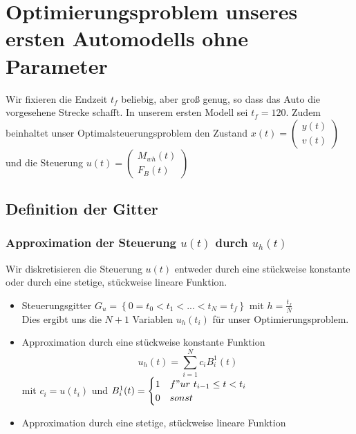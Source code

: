 \documentclass[12pt,a4paper]{article}
\theoremstyle{definition}
\theoremstyle{plain}
\begin{document}
	
	\section{Optimierungsproblem unseres ersten Automodells ohne Parameter}

	
	Wir fixieren die Endzeit $t_{f}$ beliebig, aber groß genug, so dass das Auto die vorgesehene Strecke schafft. In unserem ersten Modell sei $t_{f}=120$. Zudem beinhaltet unser Optimalsteuerungsproblem den Zustand $x(t)=\begin{pmatrix} y(t) \\ v(t) \end{pmatrix}$ und die
	Steuerung $u(t)=\begin{pmatrix} M_{wh}(t) \\ F_B(t) \end{pmatrix}$
	
	\subsection{Definition der Gitter}
	
	\subsubsection{Approximation der Steuerung $u(t)$ durch $u_{h}(t)$}
	Wir diskretisieren die Steuerung $u(t)$ entweder durch eine stückweise konstante oder durch eine stetige, stückweise lineare Funktion.
	\begin{itemize}
		\item Steuerungsgitter $G_{u}=\left\{0=t_{0} < t_{1} < ... < t_{N}=t_{f} \right\}$ mit
		$h=\frac{t_{f}}{N}$\\
		Dies ergibt uns die $N+1$ Variablen $u_{h}(t_{i})$ für unser Optimierungsproblem.
		\item Approximation durch eine stückweise konstante Funktion
		\begin{equation*}
		u_{h}(t)=\sum_{i=1}^{N}c_{i}B_{i}^{1}(t)
		\end{equation*}
		mit $c_{i}= u(t_{i})$ und $B_{i}^{1}(t)=\begin{cases} 1 & f"ur\  t_{i-1}\leq t< t_{i} \\ 0 & sonst \end{cases}$
		\item Approximation durch eine stetige, stückweise lineare Funktion
	\end{itemize}
	
	
\end{document}
